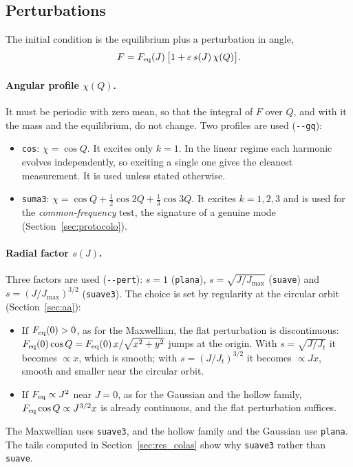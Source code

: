 \documentclass[11pt,a4paper]{article}
\begin{document}
\subsection{Perturbations}
\label{sec:perturbacion}

The initial condition is the equilibrium plus a perturbation in angle,
\[
  F = F_{\rm eq}(J)\,\big[1+\varepsilon\,s(J)\,\chi(Q)\big].
\]

\paragraph{Angular profile $\chi(Q)$.} It must be periodic with zero mean, so that the
integral of $F$ over $Q$, and with it the mass and the equilibrium, do not change. Two
profiles are used (\texttt{-{}-gq}):
\begin{itemize}
\item \texttt{cos}: $\chi=\cos Q$. It excites only $k=1$. In the linear regime each
harmonic evolves independently, so exciting a single one gives the cleanest
measurement. It is used unless stated otherwise.
\item \texttt{suma3}: $\chi=\cos Q+\tfrac12\cos2Q+\tfrac13\cos3Q$. It excites $k=1,2,3$ and is
used for the \emph{common-frequency} test, the signature of a genuine mode
(Section~\ref{sec:protocolo}).
\end{itemize}

\paragraph{Radial factor $s(J)$.} Three factors are used (\texttt{-{}-pert}): $s=1$
(\texttt{plana}), $s=\sqrt{J/J_{\max}}$ (\texttt{suave}) and $s=(J/J_{\max})^{3/2}$
(\texttt{suave3}). The choice is set by regularity at the circular orbit
(Section~\ref{sec:aa}):
\begin{itemize}
\item If $F_{\rm eq}(0)>0$, as for the Maxwellian, the flat perturbation is discontinuous:
$F_{\rm eq}(0)\cos Q=F_{\rm eq}(0)\,x/\sqrt{x^2+y^2}$ jumps at the origin. With $s=\sqrt{J/J_t}$ it
becomes $\propto x$, which is smooth; with $s=(J/J_t)^{3/2}$ it becomes $\propto Jx$, smooth and
smaller near the circular orbit.
\item If $F_{\rm eq}\propto J^2$ near $J=0$, as for the Gaussian and the hollow family,
$F_{\rm eq}\cos Q\propto J^{3/2}x$ is already continuous, and the flat perturbation suffices.
\end{itemize}
The Maxwellian uses \texttt{suave3}, and the hollow family and the Gaussian use
\texttt{plana}. The tails computed in Section~\ref{sec:res_colas} show why \texttt{suave3}
rather than \texttt{suave}.
\end{document}
